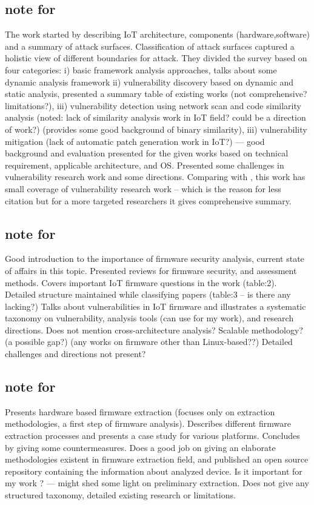 \documentclass[fleqn,10pt]{olplainarticle}
\begin{document}
\subsection{note for \cite{2}}

The work started by describing IoT architecture, components (hardware,software) and a summary of attack surfaces. Classification of attack surfaces captured a holistic view of different boundaries for attack. They divided the survey based on four categories: i) basic framework analysis approaches, talks about some dynamic analysis framework  ii) vulnerability discovery based on dynamic and static analysis, presented a summary table of existing works (not comprehensive? limitations?), iii) vulnerability detection using network scan and code similarity analysis (noted: lack of similarity analysis work in IoT field? could be a direction of work?) (provides some good background of binary similarity), iii) vulnerability mitigation (lack of automatic patch generation work in IoT?) --- good background and evaluation presented for the given works based on technical requirement, applicable architecture, and OS. Presented some challenges in vulnerability research work and some directions. Comparing with \cite{2}, this work has small coverage of vulnerability research work -- which is the reason for less citation but for a more targeted researchers it gives comprehensive summary.

\subsection{note for \cite{3}}
Good introduction to the importance of firmware security analysis, current state of affairs in this topic. Presented reviews for firmware security, and assessment methods. Covers important IoT firmware questions in the work (table:2). Detailed structure maintained while classifying papers (table:3 -- is there any lacking?) Talks about vulnerabilities in IoT firmware and illustrates a systematic taxonomy on vulnerability, analysis tools (can use for my work), and research directions. Does not mention cross-architecture analysis? Scalable methodology? (a possible gap?) (any works on firmware other than Linux-based??) Detailed challenges and directions not present?

\subsection{note for \cite{4}}

Presents hardware based firmware extraction (focuses only on extraction methodologies, a first step of firmware analysis). Describes different firmware extraction processes and presents a case study for various platforms. Concludes by giving some countermeasures. Does a good job on giving an elaborate methodologies existent in firmware extraction field, and published an open source repository containing the information about analyzed device. Is it important for my work ? --- might shed some light on preliminary extraction. Does not give any structured taxonomy, detailed existing research or limitations. 
\end{document}
